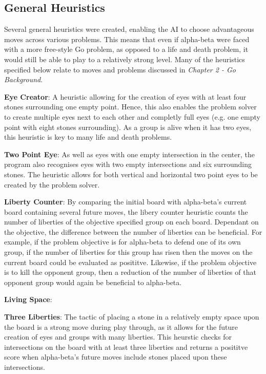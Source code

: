 \documentclass{l3proj}
\begin{document}
\subsection{General Heuristics}

Several general heuristics were created, enabling the AI to choose advantageous moves across various problems. This means that even if alpha-beta were faced with a more free-style Go problem, as opposed to a life and death problem, it would still be able to play to a relatively strong level. Many of the heuristics specified below relate to moves and problems discussed in \textit{Chapter 2 - Go Background}.

\textbf{Eye Creator}: A heuristic allowing for the creation of eyes with at least four stones surrounding one empty point. Hence, this also enables the problem solver to create multiple eyes next to each other and completly full eyes (e.g. one empty point with eight stones surrounding). As a group is alive when it has two eyes, this heuristic is key to many life and death problems.

\textbf{Two Point Eye}: As well as eyes with one empty intersection in the center, the program also recognises eyes with two empty intersections and six surrounding stones. The heuristic allows for both vertical and horizontal two point eyes to be created by the problem solver.

\textbf{Liberty Counter}: By comparing the initial board with alpha-beta's current board containing several future moves, the libery counter heuristic counts the number of liberties of the objective specified group on each board. Dependant on the objective, the difference between the number of liberties can be beneficial. For example, if the problem objective is for alpha-beta to defend one of its own group, if the number of liberties for this group has risen then the moves on the current board could be evaluated as posititve. Likewise, if the problem objective is to kill the opponent group, then a reduction of the number of liberties of that opponent group would again be beneficial to alpha-beta.

\textbf{Living Space}:

\textbf{Three Liberties}: The tactic of placing a stone in a relatively empty space upon the board is a strong move during play through, as it allows for the future creation of eyes and groups with many liberties. This heurstic checks for intersections on the board with at least three liberties and returns a posititve score when alpha-beta's future moves include stones placed upon these intersections.
\end{document}
